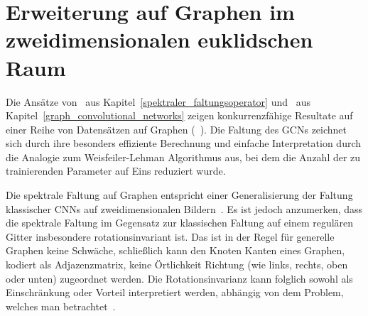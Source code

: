 \section{Erweiterung auf Graphen im zweidimensionalen euklidschen Raum}
\label{gcn_erweiterung}

Die Ansätze von~\citeauthor{Defferrard} aus Kapitel~\ref{spektraler_faltungsoperator} und~\citeauthor{gcn} aus Kapitel~\ref{graph_convolutional_networks} zeigen konkurrenzfähige Resultate auf einer Reihe von Datensätzen auf Graphen (\vgl{}~\cite{Defferrard, gcn}).
Die Faltung des \glspl{GCN} zeichnet sich durch ihre besonders effiziente Berechnung und einfache Interpretation durch die Analogie zum Weisfeiler-Lehman Algorithmus aus, bei dem die Anzahl der zu trainierenden Parameter auf Eins reduziert wurde.

Die spektrale Faltung auf Graphen entspricht einer Generalisierung der Faltung klassischer \glspl{CNN} auf zweidimensionalen Bildern~\cite{gcn_review}.
Es ist jedoch anzumerken, dass die spektrale Faltung im Gegensatz zur klassischen Faltung auf einem regulären Gitter insbesondere rotationsinvariant ist.
Das ist in der Regel für generelle Graphen keine Schwäche, schließlich kann den Knoten \bzw{} Kanten eines Graphen, kodiert als Adjazenzmatrix, keine Örtlichkeit \bzw{} Richtung (wie links, rechts, oben oder unten) zugeordnet werden.
Die Rotationsinvarianz kann folglich sowohl als Einschränkung oder Vorteil interpretiert werden, abhängig von dem Problem, welches man betrachtet~\cite{Defferrard}.

